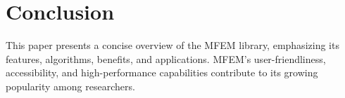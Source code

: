 \section{Conclusion}
This paper presents a concise overview of the MFEM library, emphasizing its features, algorithms, benefits, and applications. MFEM's user-friendliness, accessibility, and high-performance capabilities contribute to its growing popularity among researchers.